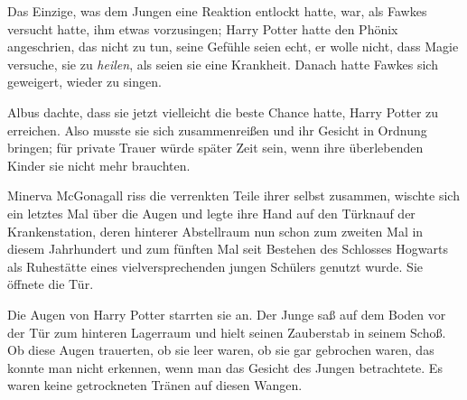 Das Einzige, was dem Jungen eine Reaktion entlockt hatte, war, als Fawkes versucht hatte, ihm etwas vorzusingen; Harry Potter hatte den Phönix angeschrien, das nicht zu tun, seine Gefühle seien echt, er wolle nicht, dass Magie versuche, sie zu \emph{heilen}, als seien sie eine Krankheit. Danach hatte Fawkes sich geweigert, wieder zu singen.


Albus dachte, dass sie jetzt vielleicht die beste Chance hatte, Harry Potter zu erreichen. Also musste sie sich zusammenreißen und ihr Gesicht in Ordnung bringen; für private Trauer würde später Zeit sein, wenn ihre überlebenden Kinder sie nicht mehr brauchten.


Minerva McGonagall riss die verrenkten Teile ihrer selbst zusammen, wischte sich ein letztes Mal über die Augen und legte ihre Hand auf den Türknauf der Krankenstation, deren hinterer Abstellraum nun schon zum zweiten Mal in diesem Jahrhundert und zum fünften Mal seit Bestehen des Schlosses Hogwarts als Ruhestätte eines vielversprechenden jungen Schülers genutzt wurde. Sie öffnete die Tür.

Die Augen von Harry Potter starrten sie an. Der Junge saß auf dem Boden vor der Tür zum hinteren Lagerraum und hielt seinen Zauberstab in seinem Schoß. Ob diese Augen trauerten, ob sie leer waren, ob sie gar gebrochen waren, das konnte man nicht erkennen, wenn man das Gesicht des Jungen betrachtete. Es waren keine getrockneten Tränen auf diesen Wangen.

